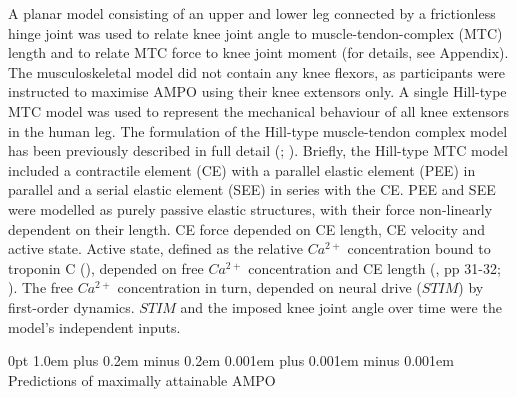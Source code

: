 \documentclass[
  11pt,
  a4paper]{article}
\makeatletter
\renewcommand{\subsubsection}{%
  \@startsection{subsubsection}{3}
    {0pt} 					%
    {1.0em plus 0.2em minus 0.2em} 	%
    {0.001em plus 0.001em minus 0.001em}    	%
    {\normalsize\bfseries\sffamily}%
}
\makeatother
\begin{document}
A planar model consisting of an upper and lower leg connected by a
frictionless hinge joint was used to relate knee joint angle to
muscle-tendon-complex (MTC) length and to relate MTC force to knee joint
moment (for details, see Appendix). The musculoskeletal model did not
contain any knee flexors, as participants were instructed to maximise
AMPO using their knee extensors only. A single Hill-type MTC model was
used to represent the mechanical behaviour of all knee extensors in the
human leg. The formulation of the Hill-type muscle-tendon complex model
has been previously described in full detail
(;
).
Briefly, the Hill-type MTC model included a contractile element (CE)
with a parallel elastic element (PEE) in parallel and a serial elastic
element (SEE) in series with the CE. PEE and SEE were modelled as purely
passive elastic structures, with their force non-linearly dependent on
their length. CE force depended on CE length, CE velocity and active
state. Active state, defined as the relative \(Ca^{2+}\) concentration
bound to troponin C (), depended on free \(Ca^{2+}\) concentration and CE length
(, pp 31-32;
). The free \(Ca^{2+}\) concentration in turn, depended on neural
drive (\(STIM\)) by first-order dynamics. \(STIM\) and the imposed knee
joint angle over time were the model's independent inputs.

\subsubsection{Predictions of maximally attainable
AMPO}\label{sec-m-predictions}
\end{document}

